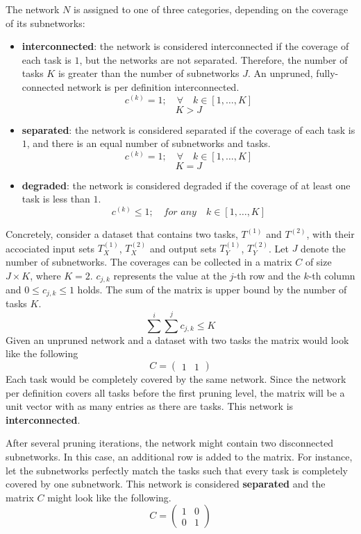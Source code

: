 The network $N$ is assigned to one of three categories, depending on the coverage of its subnetworks:
\begin{itemize}
    \item \textbf{interconnected}: the network is considered interconnected if the coverage of each task is $1$, but the networks are not separated. Therefore, the number of tasks $K$ is greater than the number of subnetworks $J$.
    An unpruned, fully-connected network is per definition interconnected.
    \[ c^{(k)} = 1; \quad\forall\quad k \in [1, \dots, K]\]
    \[ K > J \]

    \item \textbf{separated}: the network is considered separated if the coverage of each task is $1$, and there is an equal number of subnetworks and tasks.
    \[ c^{(k)} = 1; \quad\forall\quad k \in [1, \dots, K]\]
    \[ K = J \]

    \item \textbf{degraded}: the network is considered degraded if the coverage of at least one task is less than $1$.
    \[ c^{(k)} \leq 1; \quad\textit{for any}\quad k \in [1, \dots, K]\]
\end{itemize}

Concretely, consider a dataset that contains two tasks, $T^{(1)}$ and $T^{(2)}$, with their accociated input sets $T^{(1)}_X$, $T^{(2)}_X$ and output sets $T^{(1)}_Y$, $T^{(2)}_Y$.
Let $J$ denote the number of subnetworks.
The coverages can be collected in a matrix $C$ of size $J \times K$, where $K=2$. 
$c_{j,k}$ represents the value at the $j$-th row and the $k$-th column and $0 \leq c_{j,k} \leq 1$ holds.
The sum of the matrix is upper bound by the number of tasks $K$.
\[ \sum^{i} \sum^{j} c_{j,k} \leq K \]
Given an unpruned network and a dataset with two tasks the matrix would look like the following 
\[ C = \begin{pmatrix} 1 & 1 \end{pmatrix} \]
Each task would be completely covered by the same network.
Since the network per definition covers all tasks before the first pruning level, the matrix will be a unit vector with as many entries as there are tasks.
This network is \textbf{interconnected}.

After several pruning iterations, the network might contain two disconnected subnetworks.
In this case, an additional row is added to the matrix.
For instance, let the subnetworks perfectly match the tasks such that every task is completely covered by one subnetwork.
This network is considered \textbf{separated} and the matrix $C$ might look like the following.
\[ C = \begin{pmatrix} 1 & 0 \\ 0 & 1 \end{pmatrix} \]

